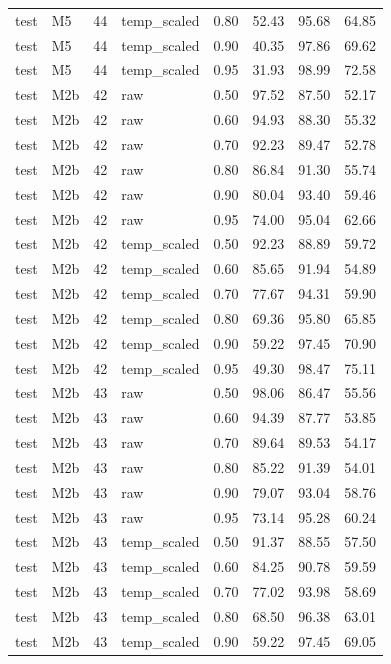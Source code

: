 \begin{tabular}{llrlrrrr}
test & M5 & 44 & temp\_scaled & 0.80 & 52.43 & 95.68 & 64.85 \\
test & M5 & 44 & temp\_scaled & 0.90 & 40.35 & 97.86 & 69.62 \\
test & M5 & 44 & temp\_scaled & 0.95 & 31.93 & 98.99 & 72.58 \\
test & M2b & 42 & raw & 0.50 & 97.52 & 87.50 & 52.17 \\
test & M2b & 42 & raw & 0.60 & 94.93 & 88.30 & 55.32 \\
test & M2b & 42 & raw & 0.70 & 92.23 & 89.47 & 52.78 \\
test & M2b & 42 & raw & 0.80 & 86.84 & 91.30 & 55.74 \\
test & M2b & 42 & raw & 0.90 & 80.04 & 93.40 & 59.46 \\
test & M2b & 42 & raw & 0.95 & 74.00 & 95.04 & 62.66 \\
test & M2b & 42 & temp\_scaled & 0.50 & 92.23 & 88.89 & 59.72 \\
test & M2b & 42 & temp\_scaled & 0.60 & 85.65 & 91.94 & 54.89 \\
test & M2b & 42 & temp\_scaled & 0.70 & 77.67 & 94.31 & 59.90 \\
test & M2b & 42 & temp\_scaled & 0.80 & 69.36 & 95.80 & 65.85 \\
test & M2b & 42 & temp\_scaled & 0.90 & 59.22 & 97.45 & 70.90 \\
test & M2b & 42 & temp\_scaled & 0.95 & 49.30 & 98.47 & 75.11 \\
test & M2b & 43 & raw & 0.50 & 98.06 & 86.47 & 55.56 \\
test & M2b & 43 & raw & 0.60 & 94.39 & 87.77 & 53.85 \\
test & M2b & 43 & raw & 0.70 & 89.64 & 89.53 & 54.17 \\
test & M2b & 43 & raw & 0.80 & 85.22 & 91.39 & 54.01 \\
test & M2b & 43 & raw & 0.90 & 79.07 & 93.04 & 58.76 \\
test & M2b & 43 & raw & 0.95 & 73.14 & 95.28 & 60.24 \\
test & M2b & 43 & temp\_scaled & 0.50 & 91.37 & 88.55 & 57.50 \\
test & M2b & 43 & temp\_scaled & 0.60 & 84.25 & 90.78 & 59.59 \\
test & M2b & 43 & temp\_scaled & 0.70 & 77.02 & 93.98 & 58.69 \\
test & M2b & 43 & temp\_scaled & 0.80 & 68.50 & 96.38 & 63.01 \\
test & M2b & 43 & temp\_scaled & 0.90 & 59.22 & 97.45 & 69.05 \\

\end{tabular}
